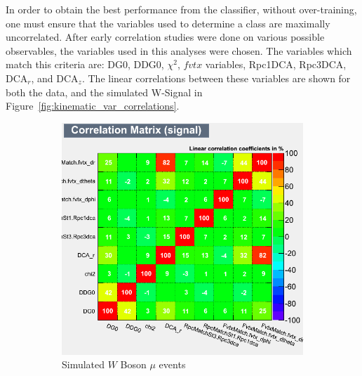 In order to obtain the best performance from the classifier, without
over-training, one must ensure that the variables used to determine a class are
maximally uncorrelated. After early correlation studies were done on various
possible observables, the variables used in this analyses were chosen. The
variables which match this criteria are: DG0, DDG0, $\chi^2$, $fvtx$ variables,
Rpc1DCA, Rpc3DCA, DCA$_r$, and DCA$_z$. The linear correlations between these
variables are shown for both the data, and the simulated W-Signal in
Figure~\ref{fig:kinematic_var_correlations}.

\begin{figure}[H]
	\centering
	\begin{subfigure}[t]{0.5\textwidth}
		\centering
		\includegraphics[width=0.95\linewidth]{./figures/CorrelationMatrix_Signal.png}
		\caption{
      Simulated $W$ Boson $\mu$ events
    }
		\label{fig:corr_mat_sig}
	\end{subfigure}%
  \begin{subfigure}[t]{0.5\textwidth}
		\centering

\end{subfigure}
\end{figure}
